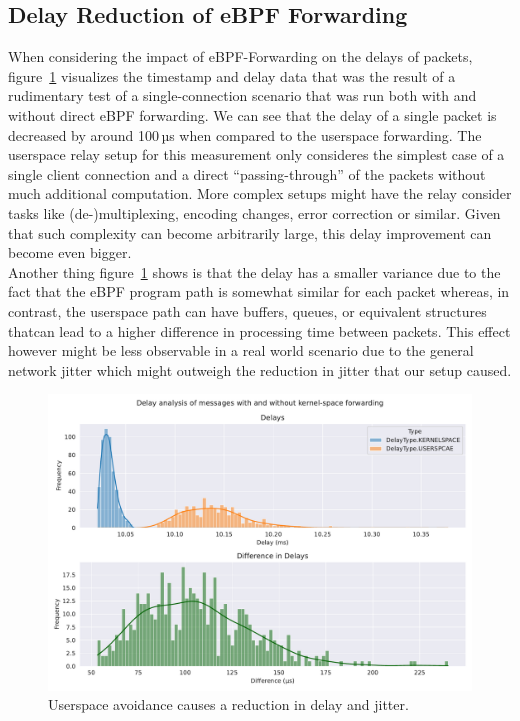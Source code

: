 \subsection{Delay Reduction of eBPF Forwarding}
When considering the impact of eBPF-Forwarding on the delays of packets, figure~\ref{fig:delay-improvement}
visualizes the timestamp and delay data that was the result of a rudimentary test of a single-connection 
scenario that was run both with and without direct eBPF forwarding.
We can see that the delay of a single packet is decreased by around 100\,µs
when compared to the userspace forwarding. 
The userspace relay setup for this measurement only consideres the simplest case of a single client connection 
and a direct ``passing-through'' of the packets without much additional computation.
More complex setups might have the relay consider tasks like (de-)multiplexing, 
encoding changes, error correction or similar. 
Given that such complexity can become arbitrarily large, this delay improvement can become even bigger.
\\
Another thing figure~\ref{fig:delay-improvement} shows is that the delay has a smaller variance due to the fact 
that the eBPF program path is somewhat similar for each packet whereas, in contrast, the userspace path can have 
buffers, queues, or equivalent structures thatcan lead to a higher difference in processing time between packets. 
This effect however might be less observable in a real world scenario due to the general network jitter which 
might outweigh the reduction in jitter that our setup caused.
\begin{figure}[htbp]
    \centering
    \includegraphics[width=\textwidth]{figures/04_testing_and_results/delays_small_packets_simple_userspace.pdf}
    \caption[Delay analysis of eBPF approach]{Userspace avoidance causes a reduction in delay and jitter.}\label{fig:delay-improvement}
\end{figure}


